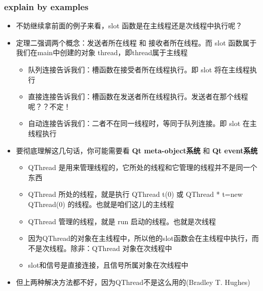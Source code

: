 \documentclass[9pt,b5paper]{article}
\begin{document}
\subsubsection{explain by examples}
\label{sec-3-2-2}
\begin{itemize}
\item 不妨继续拿前面的例子来看，slot 函数是在主线程还是次线程中执行呢？
\item 定理二强调两个概念：发送者所在线程 和 接收者所在线程。而 slot 函数属于我们在main中创建的对象 thread，即thread属于主线程
\begin{itemize}
\item 队列连接告诉我们：槽函数在接受者所在线程执行。即 slot 将在主线程执行
\item 直接连接告诉我们：槽函数在发送者所在线程执行。发送者在那个线程呢？？不定！
\item 自动连接告诉我们：二者不在同一线程时，等同于队列连接。即 slot 在主线程执行
\end{itemize}
\item 要彻底理解这几句话，你可能需要看 \textbf{Qt meta-object系统} 和 \textbf{Qt event系统} 
\begin{itemize}
\item QThread 是用来管理线程的，它所处的线程和它管理的线程并不是同一个东西
\item QThread 所处的线程，就是执行 QThread t(0) 或 QThread * t=new QThread(0) 的线程。也就是咱们这儿的主线程
\item QThread 管理的线程，就是 run 启动的线程。也就是次线程
\item 因为QThread的对象在主线程中，所以他的slot函数会在主线程中执行，而不是次线程。除非：QThread 对象在次线程中
\item slot和信号是直接连接，且信号所属对象在次线程中
\end{itemize}
\item 但上两种解决方法都不好，因为QThread不是这么用的(Bradley T. Hughes)
\end{itemize}
\end{document}
